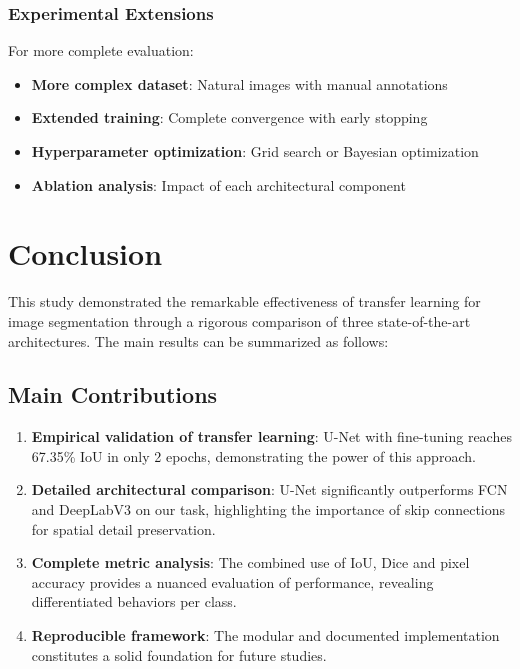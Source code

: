\documentclass[12pt,a4paper]{article}
\begin{document}
\subsubsection{Experimental Extensions}

For more complete evaluation:
\begin{itemize}
    \item \textbf{More complex dataset}: Natural images with manual annotations
    \item \textbf{Extended training}: Complete convergence with early stopping
    \item \textbf{Hyperparameter optimization}: Grid search or Bayesian optimization
    \item \textbf{Ablation analysis}: Impact of each architectural component
\end{itemize}

\section{Conclusion}

This study demonstrated the remarkable effectiveness of transfer learning for image segmentation through a rigorous comparison of three state-of-the-art architectures. The main results can be summarized as follows:

\subsection{Main Contributions}

\begin{enumerate}
    \item \textbf{Empirical validation of transfer learning}: U-Net with fine-tuning reaches 67.35\% IoU in only 2 epochs, demonstrating the power of this approach.

    \item \textbf{Detailed architectural comparison}: U-Net significantly outperforms FCN and DeepLabV3 on our task, highlighting the importance of skip connections for spatial detail preservation.

    \item \textbf{Complete metric analysis}: The combined use of IoU, Dice and pixel accuracy provides a nuanced evaluation of performance, revealing differentiated behaviors per class.

    \item \textbf{Reproducible framework}: The modular and documented implementation constitutes a solid foundation for future studies.
\end{enumerate}
\end{document}
